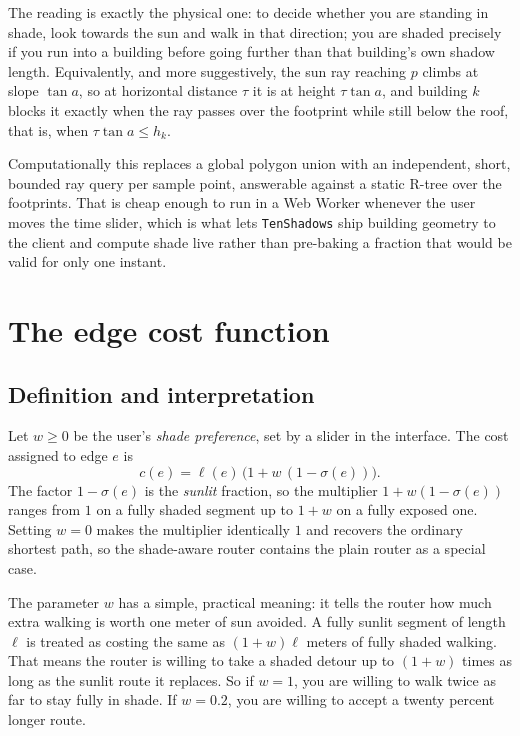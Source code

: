 \documentclass[11pt,a4paper]{article}
\theoremstyle{plain}
\theoremstyle{definition}
\theoremstyle{remark}
\begin{document}
The reading is exactly the physical one: to decide whether you are standing in shade, look towards the sun and walk in that direction; you are shaded precisely if you run into a building before going further than that building's own shadow length. Equivalently, and more suggestively, the sun ray reaching $p$ climbs at slope $\tan a$, so at horizontal distance $\tau$ it is at height $\tau \tan a$, and building $k$ blocks it exactly when the ray passes over the footprint while still below the roof, that is, when $\tau \tan a \le h_k$.

Computationally this replaces a global polygon union with an independent, short, bounded ray query per sample point, answerable against a static R-tree over the footprints. That is cheap enough to run in a Web Worker whenever the user moves the time slider, which is what lets \texttt{TenShadows} ship building geometry to the client and compute shade live rather than pre-baking a fraction that would be valid for only one instant.

\section{The edge cost function}
\label{sec:cost}

\subsection{Definition and interpretation}

Let $w \ge 0$ be the user's \emph{shade preference}, set by a slider in the interface. The cost assigned to edge $e$ is
$$c(e) = \ell(e)\,\big(1 + w\,(1 - \sigma(e))\big).$$
The factor $1 - \sigma(e)$ is the \emph{sunlit} fraction, so the multiplier $1 + w(1-\sigma(e))$ ranges from $1$ on a fully shaded segment up to $1 + w$ on a fully exposed one. Setting $w = 0$ makes the multiplier identically $1$ and recovers the ordinary shortest path, so the shade-aware router contains the plain router as a special case.

The parameter $w$ has a simple, practical meaning: it tells the router how much extra walking is worth one meter of sun avoided. A fully sunlit segment of length $\ell$ is treated as costing the same as $(1+w)\ell$ meters of fully shaded walking. That means the router is willing to take a shaded detour up to $(1+w)$ times as long as the sunlit route it replaces. So if $w = 1$, you are willing to walk twice as far to stay fully in shade. If $w = 0.2$, you are willing to accept a twenty percent longer route.
\end{document}
